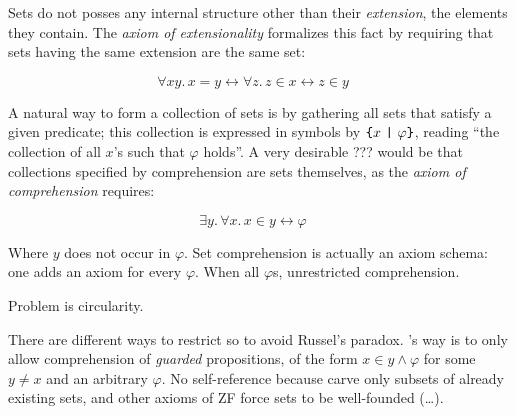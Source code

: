\documentclass[sigplan,10pt,anonymous,review]{acmart}%
\begin{document}


Sets do not posses any internal structure other than their \emph{extension}, \ie{} the elements they contain. The \emph{axiom of extensionality} formalizes this fact by requiring that sets having the same extension are the same set:

\[\forall x y.\, x = y \leftrightarrow \forall z. \, z \in x \leftrightarrow z \in y \quad \tag{\SetExt} \]

A natural way to form a collection of sets is by gathering all sets that satisfy a given predicate; this collection is expressed in symbols by $\text{\texttt{\{}} x ~\text{\texttt{|}}~ \varphi \text{\texttt{\}}}$, reading ``the collection of all $x$'s such that $\varphi$ holds''.  A very desirable ??? would be that collections specified by comprehension are sets themselves, as the \emph{axiom of comprehension} requires:

\[ \exists y.\, \forall x.\, x \in y \leftrightarrow \varphi  \quad \tag{\SetCompr} \]


Where $y$ does not occur in $\varphi$. 
Set comprehension is actually an axiom schema: one adds an axiom for every $\varphi$. 
When all $\varphi$s, unrestricted comprehension. 


Problem is circularity.

There are different ways to restrict \SetCompr{} so to avoid Russel's paradox. \ZF's way is to only allow comprehension of \emph{guarded} propositions, of the form $x \in y \land \varphi$ for some $y\neq x$ and an arbitrary $\varphi$.  No self-reference because carve only subsets of already existing sets, and other axioms of ZF force sets to be well-founded (\dots).
\end{document}
